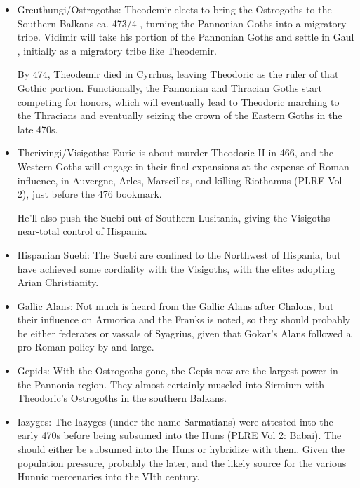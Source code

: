 \documentclass{article}
\begin{document}
\begin{itemize}
		\item Greuthungi/Ostrogoths:\newline
		Theodemir elects to bring the Ostrogoths to the Southern Balkans ca. 473/4 \cite{HeatherEmpiresAndBarbarians}, turning the Pannonian Goths into a migratory tribe. Vidimir will take his portion of the Pannonian Goths and settle in Gaul \cite{WolframHistoryOfTheGoths}, initially as a migratory tribe like Theodemir.
		
		By 474, Theodemir died in Cyrrhus, leaving Theodoric as the ruler of that Gothic portion.
		Functionally, the Pannonian and Thracian Goths start competing for honors, which will eventually lead to Theodoric marching to the Thracians and eventually seizing the crown of the Eastern Goths in the late 470s.
		
		\item Therivingi/Visigoths:\newline
		Euric is about murder Theodoric II in 466, and the Western Goths will engage in their final expansions at the expense of Roman influence, in Auvergne, Arles, Marseilles, and killing Riothamus (PLRE Vol 2), just before the 476 bookmark.
		
		He'll also push the Suebi out of Southern Lusitania, giving the Visigoths near-total control of Hispania.
		
		\item Hispanian Suebi:\newline
		The Suebi are confined to the Northwest of Hispania, but have achieved some cordiality with the Visigoths, with the elites adopting Arian Christianity.
		
		\item Gallic Alans:\newline
		Not much is heard from the Gallic Alans after Chalons, but their influence on Armorica and the Franks is noted, so they should probably be either federates or vassals of Syagrius, given that Gokar's Alans followed a pro-Roman policy by and large.
		
		\item Gepids:\newline
		With the Ostrogoths gone, the Gepis now are the largest power in the Pannonia region.
		They almost certainly muscled into Sirmium with Theodoric's Ostrogoths in the southern Balkans.
		
		\item Iazyges:\newline
		The Iazyges (under the name Sarmatians) were attested into the early 470s before being subsumed into the Huns (PLRE Vol 2: Babai).
		The should either be subsumed into the Huns or hybridize with them.
		Given the population pressure, probably the later, and the likely source for the various Hunnic mercenaries into the VIth century.
		

\end{itemize}
\end{document}
